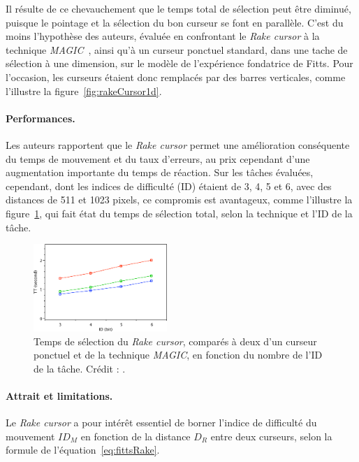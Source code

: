 	Il résulte de ce chevauchement que le temps total de sélection peut être diminué, puisque le pointage et la sélection du bon curseur se font en parallèle. C'est du moins l'hypothèse des auteurs, évaluée en confrontant le \emph{Rake cursor} à la technique \emph{MAGIC}~\cite{zhai1999manual}, ainsi qu'à un curseur ponctuel standard, dans une tache de sélection à une dimension, sur le modèle de l'expérience fondatrice de Fitts. Pour l'occasion, les curseurs étaient donc remplacés par des barres verticales, comme l'illustre la figure~\ref{fig:rakeCursor1d}.
	
	\paragraph{Performances.}
	Les auteurs rapportent que le \emph{Rake cursor} permet une amélioration conséquente du temps de mouvement et du taux d'erreurs, au prix cependant d'une augmentation importante du temps de réaction. Sur les tâches évaluées, cependant, dont les indices de difficulté (ID) étaient de 3, 4, 5 et 6, avec des distances de 511 et 1023 pixels, ce compromis est avantageux, comme l'illustre la figure~\ref{fig:rakeCursorPerf}, qui fait état du temps de sélection total, selon la technique et l'ID de la tâche.
	
	\begin{figure}
		\centering
		\includegraphics[width=0.45\textwidth]{figures/ch2/rakeCursorPerf}
		\caption[\emph{Rake cursor} -- performances]{Temps de sélection du \emph{Rake cursor}, comparés à deux d'un curseur ponctuel et de la technique \emph{MAGIC}, en fonction du nombre de l'ID de la tâche. Crédit : \cite{blanch2009rake}.}
		\label{fig:rakeCursorPerf}
	\end{figure}
	
	\paragraph{Attrait et limitations.}
	Le \emph{Rake cursor} a pour intérêt essentiel de borner l'indice de difficulté du mouvement $ID_{M}$ en fonction de la distance $D_{R}$ entre deux curseurs, selon la formule de l'équation~\ref{eq:fittsRake}.
	
